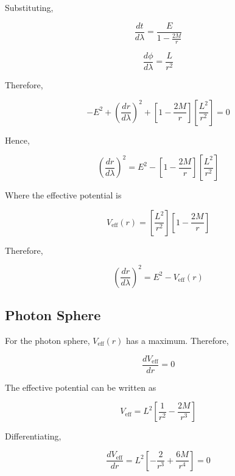 \documentclass[12pt]{article}
\begin{document}
\begin{itemize}
Substituting,

\begin{equation}
\frac{dt}{d\lambda}
=
\frac{E}{1-\frac{2M}{r}}
\end{equation}

\begin{equation}
\frac{d\phi}{d\lambda}
=
\frac{L}{r^2}
\end{equation}

Therefore,

\begin{equation}
-E^2
+
\left(\frac{dr}{d\lambda}\right)^2
+
\left[1-\frac{2M}{r}\right]
\left[\frac{L^2}{r^2}\right]
=0
\end{equation}

Hence,

\begin{equation}
\left(\frac{dr}{d\lambda}\right)^2
=
E^2
-
\left[1-\frac{2M}{r}\right]
\left[\frac{L^2}{r^2}\right]
\end{equation}

Where the effective potential is

\begin{equation}
V_{\mathrm{eff}}(r)
=
\left[\frac{L^2}{r^2}\right]
\left[1-\frac{2M}{r}\right]
\end{equation}

Therefore,

\begin{equation}
\left(\frac{dr}{d\lambda}\right)^2
=
E^2-V_{\mathrm{eff}}(r)
\end{equation}


\subsection{Photon Sphere}

For the photon sphere, $V_{\mathrm{eff}}(r)$ has a maximum. Therefore,

\begin{equation}
\frac{dV_{\mathrm{eff}}}{dr}=0
\end{equation}

The effective potential can be written as

\begin{equation}
V_{\mathrm{eff}}
=
L^2
\left[
\frac{1}{r^2}
-
\frac{2M}{r^3}
\right]
\end{equation}

Differentiating,

\begin{equation}
\frac{dV_{\mathrm{eff}}}{dr}
=
L^2
\left[
-\frac{2}{r^3}
+
\frac{6M}{r^4}
\right]
=0
\end{equation}


\end{itemize}
\end{document}

